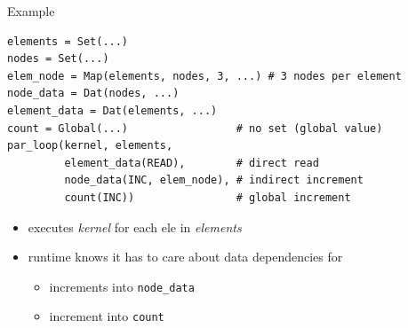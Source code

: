 \documentclass[bigger]{beamer}
\begin{document}
\begin{frame}[fragile,label={sec:orgheadline8}]{Example}
 \begin{verbatim}
elements = Set(...)
nodes = Set(...)
elem_node = Map(elements, nodes, 3, ...) # 3 nodes per element
node_data = Dat(nodes, ...)
element_data = Dat(elements, ...)
count = Global(...)                 # no set (global value)
par_loop(kernel, elements,
         element_data(READ),        # direct read
         node_data(INC, elem_node), # indirect increment
         count(INC))                # global increment
\end{verbatim}
\begin{itemize}
\item executes \emph{kernel} for each ele in \emph{elements}
\item runtime knows it has to care about data dependencies for
\begin{itemize}
\item increments into \texttt{node\_data}
\item increment into \texttt{count}
\end{itemize}
\end{itemize}
\end{frame}
\end{document}
